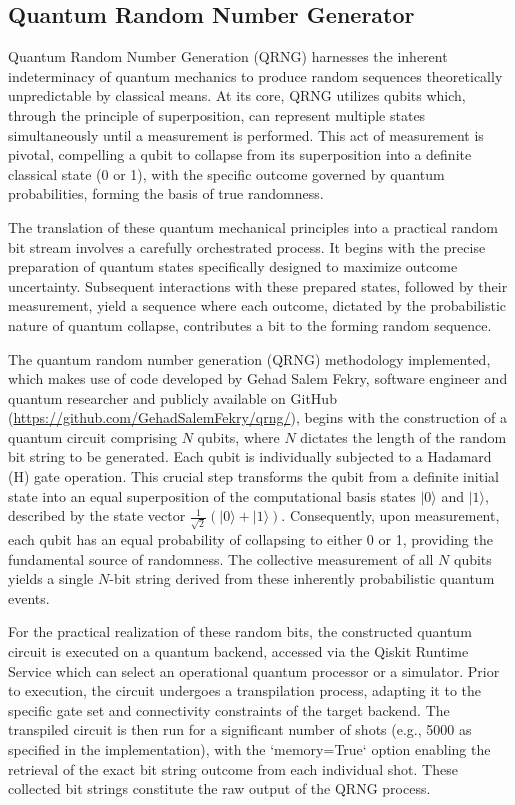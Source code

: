 \subsection{Quantum Random Number Generator}

Quantum Random Number Generation (QRNG) harnesses the inherent indeterminacy of quantum mechanics to produce random sequences theoretically unpredictable by classical means. At its core, QRNG utilizes qubits which, through the principle of superposition, can represent multiple states simultaneously until a measurement is performed. This act of measurement is pivotal, compelling a qubit to collapse from its superposition into a definite classical state (0 or 1), with the specific outcome governed by quantum probabilities, forming the basis of true randomness.

The translation of these quantum mechanical principles into a practical random bit stream involves a carefully orchestrated process. It begins with the precise preparation of quantum states specifically designed to maximize outcome uncertainty. Subsequent interactions with these prepared states, followed by their measurement, yield a sequence where each outcome, dictated by the probabilistic nature of quantum collapse, contributes a bit to the forming random sequence.

The quantum random number generation (QRNG) methodology implemented, which makes use of code developed by Gehad Salem Fekry, software engineer and quantum researcher and publicly available on GitHub (\url{https://github.com/GehadSalemFekry/qrng/}), begins with the construction of a quantum circuit comprising $N$ qubits, where $N$ dictates the length of the random bit string to be generated. Each qubit is individually subjected to a Hadamard (H) gate operation. This crucial step transforms the qubit from a definite initial state into an equal superposition of the computational basis states $|0\rangle$ and $|1\rangle$, described by the state vector $\frac{1}{\sqrt{2}}(|0\rangle + |1\rangle)$. Consequently, upon measurement, each qubit has an equal probability of collapsing to either 0 or 1, providing the fundamental source of randomness. The collective measurement of all $N$ qubits yields a single $N$-bit string derived from these inherently probabilistic quantum events.

For the practical realization of these random bits, the constructed quantum circuit is executed on a quantum backend, accessed via the Qiskit Runtime Service which can select an operational quantum processor or a simulator. Prior to execution, the circuit undergoes a transpilation process, adapting it to the specific gate set and connectivity constraints of the target backend. The transpiled circuit is then run for a significant number of shots (e.g., 5000 as specified in the implementation), with the `memory=True` option enabling the retrieval of the exact bit string outcome from each individual shot. These collected bit strings constitute the raw output of the QRNG process.


